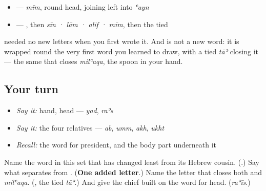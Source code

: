 \begin{itemize}
\raggedright
  \item \textbf{} — \emph{mīm}, round head, joining left into \emph{ʿayn}
  \item \textbf{} — \textbf{}, then \emph{sīn · lām · alif · mīm}, then the tied \textbf{}
\end{itemize}

\textbf{} needed no new letters when you first wrote it. And \textbf{} is not a new word: it is \textbf{} wrapped round the very first word you learned to draw, with a tied \emph{tāʾ} closing it — the same \textbf{} that closes \emph{milʿaqa}, the spoon in your hand.

\subsection*{Your turn}
\begin{itemize}
\raggedright
  \item \emph{Say it:} hand, head — \emph{yad}, \emph{raʾs}
  \item \emph{Say it:} the four relatives — \emph{ab}, \emph{umm}, \emph{akh}, \emph{ukht}
  \item \emph{Recall:} the word for president, and the body part underneath it
\end{itemize}

\begin{tcolorbox}[breakable,colback=teal!4,colframe=teal!35!black,title={Before you move on}]
Name the word in this set that has changed least from its Hebrew cousin. (\textbf{}.) Say what separates \textbf{} from \textbf{}. (\textbf{One added letter}.) Name the letter that closes both \textbf{} and \emph{milʿaqa}. (\textbf{}, the tied \emph{tāʾ}.) And give the chief built on the word for head. (\emph{raʾīs}.)
\end{tcolorbox}
